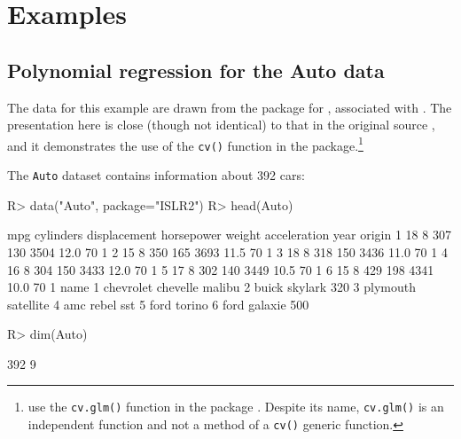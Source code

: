 \documentclass[
]{jss}
\begin{document}
\hypertarget{examples}{%
\section{Examples}\label{examples}}

\hypertarget{polynomial-regression-for-the-auto-data}{%
\subsection{Polynomial regression for the Auto
data}\label{polynomial-regression-for-the-auto-data}}

The data for this example are drawn from the  package for
, associated with \citet{JamesEtAl:2021}. The presentation
here is close (though not identical) to that in the original source
\citep[ Secs. 5.1, 5.3]{JamesEtAl:2021}, and it demonstrates the use of
the \texttt{cv()} function in the  package.\footnote{\citet{JamesEtAl:2021}
  use the \texttt{cv.glm()} function in the  package
  \citep{CantyRipley2022, DavisonHinkley:1997}. Despite its name,
  \texttt{cv.glm()} is an independent function and not a method of a
  \texttt{cv()} generic function.}

The \texttt{Auto} dataset contains information about 392 cars:

\begin{CodeChunk}
\begin{CodeInput}
R> data("Auto", package="ISLR2")
R> head(Auto)
\end{CodeInput}
\begin{CodeOutput}
  mpg cylinders displacement horsepower weight acceleration year origin
1  18         8          307        130   3504         12.0   70      1
2  15         8          350        165   3693         11.5   70      1
3  18         8          318        150   3436         11.0   70      1
4  16         8          304        150   3433         12.0   70      1
5  17         8          302        140   3449         10.5   70      1
6  15         8          429        198   4341         10.0   70      1
                       name
1 chevrolet chevelle malibu
2         buick skylark 320
3        plymouth satellite
4             amc rebel sst
5               ford torino
6          ford galaxie 500
\end{CodeOutput}
\begin{CodeInput}
R> dim(Auto)
\end{CodeInput}
\begin{CodeOutput}
[1] 392   9
\end{CodeOutput}
\end{CodeChunk}
\end{document}

